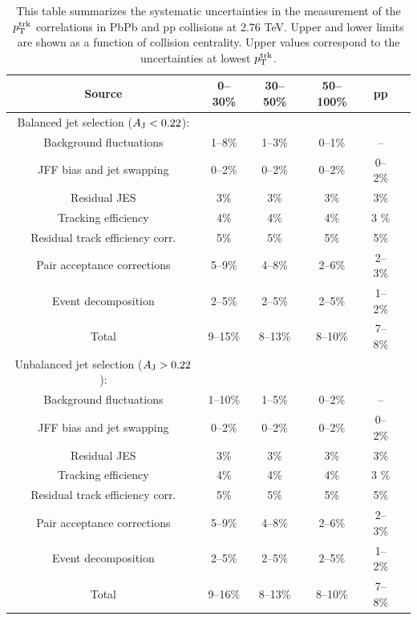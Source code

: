 \begin{table}[htbp]

\begin{center}
\caption[Systematic uncertainties for balanced and unbalanced dijets in transverse momentum distribution studies at 2.76 TeV]{This table summarizes the systematic uncertainties in the measurement of the $p_{\rm T}^{\rm trk}$ correlations in PbPb and pp collisions at 2.76 TeV. Upper and lower limits are shown as a function of collision centrality.  Upper values correspond to the uncertainties at lowest $p_{\rm T}^{\rm trk}$.}
\label{tab:sys3}
\begin{tabular}{c|ccccc}
\hline
\hline

Source & 0--30\% &   30--50\% & 50--100\% & pp \\ \hline
\hline
Balanced jet selection ($A_{\rm J} < 0.22$):\\
\hline
Background fluctuations                       & 1--8\%  & 1--3\% & 0--1\% & -- \\
JFF bias and jet swapping               & 0--2\%  &   0--2\% & 0--2\% &    0--2\% \\
Residual JES                                   & 3\% &      3\% &    3\% &    3\% \\
Tracking efficiency         & 4\%  & 4\% & 4\% & 3 \%  \\
Residual track efficiency corr.              &    5\%  &    5\% &    5\% &    5\% \\
Pair acceptance corrections                  & 5--9\%  & 4--8\% & 2--6\% & 2--3\% \\
Event decomposition                      & 2--5\% & 2--5\% & 2--5\% & 1--2\% \\
\hline
Total                                        & 9--15\%  & 8--13\% & 8--10\% & 7--8\% \\
\hline
\hline
Unbalanced jet selection ($A_{\rm J} > 0.22$):\\
\hline
Background fluctuations                       & 1--10\% &  1--5\% & 0--2\% & -- \\
JFF bias and jet swapping               & 0--2\% &      0--2\% & 0--2\% &    0--2\% \\
Residual JES                                   & 3\% &     3\% &    3\% &    3\% \\
Tracking efficiency           & 4\% & 4\% & 4\% & 3 \%  \\
Residual track efficiency corr.              &    5\% &    5\% &    5\% &    5\% \\
Pair acceptance corrections                  & 5--9\%  & 4--8\% & 2--6\% & 2--3\% \\
Event decomposition                    & 2--5\% &  2--5\% & 2--5\% & 1--2\% \\
\hline
Total                                        & 9--16\%  & 8--13\% & 8--10\% & 7--8\% \\

\hline
\hline

\end{tabular}
\end{center}
\end{table}


